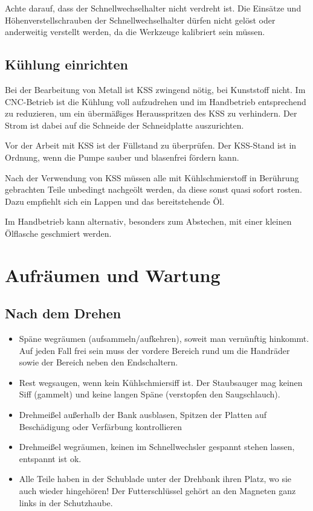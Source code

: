 \documentclass{\basedir/fablab-document}
\begin{document}
Achte darauf, dass der Schnellwechselhalter nicht verdreht ist. Die Einsätze und Höhenverstellschrauben der Schnellwechselhalter dürfen nicht gelöst oder anderweitig verstellt werden, da die Werkzeuge kalibriert sein müssen.

\subsection{Kühlung einrichten}

Bei der Bearbeitung von Metall ist KSS zwingend nötig, bei Kunststoff nicht.
Im CNC-Betrieb ist die Kühlung voll aufzudrehen und im Handbetrieb entsprechend zu reduzieren,
um ein übermäßiges Herausspritzen des KSS zu verhindern.
Der Strom ist dabei auf die Schneide der Schneidplatte auszurichten.

Vor der Arbeit mit KSS ist der Füllstand zu überprüfen. Der KSS-Stand ist in Ordnung, wenn die Pumpe sauber und blasenfrei fördern kann.

Nach der Verwendung von KSS müssen alle mit Kühlschmierstoff in Berührung gebrachten Teile unbedingt nachgeölt werden, da diese sonst quasi sofort rosten. Dazu empfiehlt sich ein Lappen und das bereitstehende Öl.

Im Handbetrieb kann alternativ, besonders zum Abstechen, mit einer kleinen Ölflasche geschmiert werden. 

\section{Aufräumen und Wartung}

\subsection{Nach dem Drehen}

\begin{itemize}
 \item Späne wegräumen (aufsammeln/aufkehren), soweit man vernünftig hinkommt. Auf jeden Fall frei sein muss der vordere Bereich rund um die Handräder sowie der Bereich neben den Endschaltern.
 \item Rest wegsaugen, wenn kein Kühlschmiersiff ist. Der Staubsauger mag keinen Siff (gammelt) und keine langen Späne (verstopfen den Saugschlauch).
 \item Drehmeißel außerhalb der Bank ausblasen, Spitzen der Platten auf Beschädigung oder Verfärbung kontrollieren
 \item Drehmeißel wegräumen, keinen im Schnellwechsler gespannt stehen lassen, entspannt ist ok.
 \item Alle Teile haben in der Schublade unter der Drehbank ihren Platz, wo sie auch wieder hingehören! Der Futterschlüssel gehört an den Magneten ganz links in der Schutzhaube.
\end{itemize}
\end{document}
